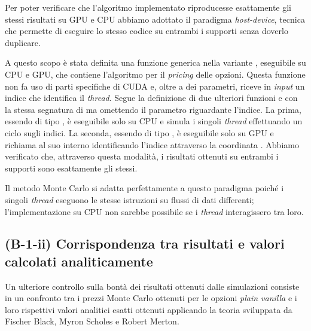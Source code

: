 Per poter verificare che l'algoritmo implementato riproducesse esattamente gli stessi risultati su GPU e CPU abbiamo adottato il paradigma \textit{host-device}, tecnica che permette di eseguire lo stesso codice su entrambi i supporti senza doverlo duplicare.

A questo scopo è stata definita una funzione generica  nella variante , eseguibile su CPU e GPU, che contiene l'algoritmo per il \textit{pricing} delle opzioni. Questa funzione non fa uso di parti specifiche di CUDA e, oltre a dei parametri, riceve in \textit{input} un indice che identifica il \textit{thread}. Segue la definizione di due ulteriori funzioni  e   con la stessa segnatura di  ma omettendo il parametro riguardante l'indice. La prima, essendo di tipo , è eseguibile solo su CPU e simula i singoli \textit{thread} effettuando un ciclo  sugli indici. La seconda, essendo di tipo , è eseguibile solo su GPU e richiama al suo interno  identificando l'indice attraverso la coordinata . Abbiamo verificato che, attraverso questa modalità, i risultati ottenuti su entrambi i supporti sono esattamente gli stessi.

Il metodo Monte Carlo si adatta perfettamente a questo paradigma poiché i singoli \textit{thread} eseguono le stesse istruzioni su flussi di dati differenti; l'implementazione su CPU non sarebbe possibile se i \textit{thread} interagissero tra loro. 

\subsection{(B-1-ii) Corrispondenza tra risultati e valori calcolati analiticamente}
\label{sec:MC-BS}
Un ulteriore controllo sulla bontà dei risultati ottenuti dalle simulazioni consiste in un confronto tra i prezzi Monte Carlo ottenuti per le opzioni \textit{plain vanilla} e i loro rispettivi valori analitici esatti ottenuti applicando la teoria sviluppata da Fischer Black, Myron Scholes e Robert Merton. 

